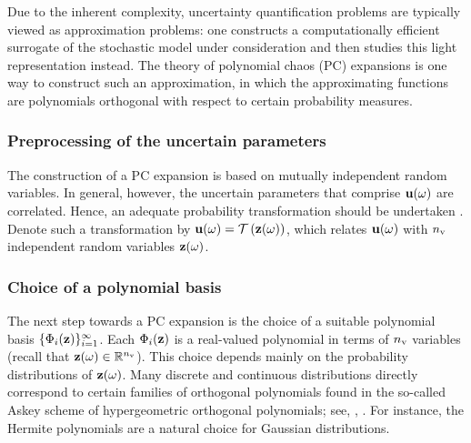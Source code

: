 Due to the inherent complexity, uncertainty quantification problems are typically viewed as approximation problems: one constructs a computationally efficient surrogate of the stochastic model under consideration and then studies this light representation instead.
The theory of polynomial chaos (PC) expansions \cite{maitre2010} is one way to construct such an approximation, in which the approximating functions are polynomials orthogonal with respect to certain probability measures.

\subsubsection{Preprocessing of the uncertain parameters}
The construction of a PC expansion is based on mutually independent random variables.
In general, however, the uncertain parameters that comprise $\mathbf{u}(\omega)$ are correlated.
Hence, an adequate probability transformation should be undertaken \cite{eldred2008}.
Denote such a transformation by $\vU(\o) = \oTransform{\vZ(\o)}$, which relates $\mathbf{u}(\omega)$ with ${n_\text{v}}$ independent random variables $\mathbf{z}(\omega)$.

\subsubsection{Choice of a polynomial basis}
The next step towards a PC expansion is the choice of a suitable polynomial basis $\{ \Phi_i(\mathbf{z}) \}_{i = 1}^\infty$.
Each $\Phi_i(\mathbf{z})$ is a real-valued polynomial in terms of ${n_\text{v}}$ variables (recall that $\mathbf{z}(\omega) \in \mathbb{R}^{n_\text{v}}$).
This choice depends mainly on the probability distributions of $\mathbf{z}(\omega)$.
Many discrete and continuous distributions directly correspond to certain families of orthogonal polynomials found in the so-called Askey scheme of hypergeometric orthogonal polynomials; see, \eg, \cite{eldred2008}.
For instance, the Hermite polynomials are a natural choice for Gaussian distributions.

